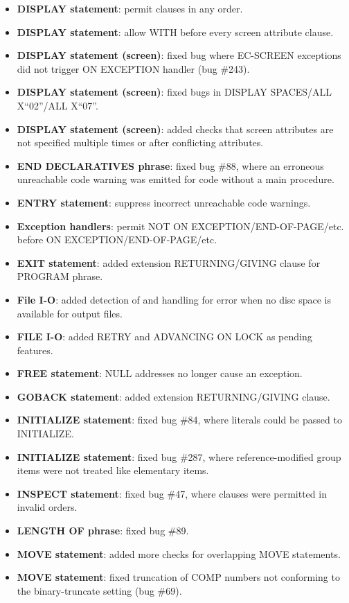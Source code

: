 \begin{itemize}
\item \textbf{DISPLAY statement}: permit clauses in any order.
\item \textbf{DISPLAY statement}: allow WITH before every screen attribute clause.
\item \textbf{DISPLAY statement (screen)}: fixed bug where EC-SCREEN exceptions did not trigger ON EXCEPTION handler (bug \#243).
\item \textbf{DISPLAY statement (screen)}: fixed bugs in DISPLAY SPACES\slash{}ALL X``02''\slash{}ALL X``07''.
\item \textbf{DISPLAY statement (screen)}: added checks that screen attributes are not specified multiple times or after conflicting attributes.
\item \textbf{END DECLARATIVES phrase}: fixed bug \#88, where an erroneous unreachable code warning was emitted for code without a main procedure.
\item \textbf{ENTRY statement}: suppress incorrect unreachable code warnings.
\item \textbf{Exception handlers}: permit NOT ON EXCEPTION\slash{}END-OF-PAGE\slash{}etc. before ON EXCEPTION\slash{}END-OF-PAGE\slash{}etc.
\item \textbf{EXIT statement}: added extension RETURNING\slash{}GIVING clause for PROGRAM phrase.
\item \textbf{File I-O}: added detection of and handling for error when no disc space is available for output files.
\item \textbf{FILE I-O}: added RETRY and ADVANCING ON LOCK as pending features.
\item \textbf{FREE statement}: NULL addresses no longer cause an exception.
\item \textbf{GOBACK statement}: added extension RETURNING\slash{}GIVING clause.
\item \textbf{INITIALIZE statement}: fixed bug \#84, where literals could be passed to INITIALIZE.
\item \textbf{INITIALIZE statement}: fixed bug \#287, where reference-modified group items were not treated like elementary items.
\item \textbf{INSPECT statement}: fixed bug \#47, where clauses were permitted in invalid orders.
\item \textbf{LENGTH OF phrase}: fixed bug \#89.
\item \textbf{MOVE statement}: added more checks for overlapping MOVE statements.
\item \textbf{MOVE statement}: fixed truncation of COMP numbers not conforming to the binary-truncate setting (bug \#69).

\end{itemize}
